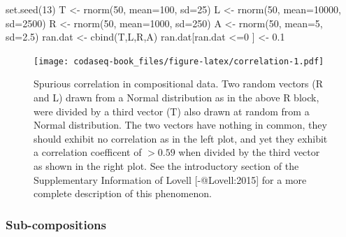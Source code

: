 \documentclass[
  onecolumn]{article}
\newenvironment{Shaded}{\begin{snugshade}}{\end{snugshade}}
\newcommand{\AttributeTok}[1]{\textcolor[rgb]{0.77,0.63,0.00}{#1}}
\newcommand{\DecValTok}[1]{\textcolor[rgb]{0.00,0.00,0.81}{#1}}
\newcommand{\FloatTok}[1]{\textcolor[rgb]{0.00,0.00,0.81}{#1}}
\newcommand{\FunctionTok}[1]{\textcolor[rgb]{0.00,0.00,0.00}{#1}}
\newcommand{\NormalTok}[1]{#1}
\newcommand{\OtherTok}[1]{\textcolor[rgb]{0.56,0.35,0.01}{#1}}
\newcommand{\SpecialCharTok}[1]{\textcolor[rgb]{0.00,0.00,0.00}{#1}}
\begin{document}
\begin{Shaded}
\begin{Highlighting}[]
\FunctionTok{set.seed}\NormalTok{(}\DecValTok{13}\NormalTok{)}
\NormalTok{T }\OtherTok{\textless{}{-}} \FunctionTok{rnorm}\NormalTok{(}\DecValTok{50}\NormalTok{, }\AttributeTok{mean=}\DecValTok{100}\NormalTok{, }\AttributeTok{sd=}\DecValTok{25}\NormalTok{)}
\NormalTok{L }\OtherTok{\textless{}{-}} \FunctionTok{rnorm}\NormalTok{(}\DecValTok{50}\NormalTok{, }\AttributeTok{mean=}\DecValTok{10000}\NormalTok{, }\AttributeTok{sd=}\DecValTok{2500}\NormalTok{)}
\NormalTok{R }\OtherTok{\textless{}{-}} \FunctionTok{rnorm}\NormalTok{(}\DecValTok{50}\NormalTok{, }\AttributeTok{mean=}\DecValTok{1000}\NormalTok{, }\AttributeTok{sd=}\DecValTok{250}\NormalTok{)}
\NormalTok{A }\OtherTok{\textless{}{-}} \FunctionTok{rnorm}\NormalTok{(}\DecValTok{50}\NormalTok{, }\AttributeTok{mean=}\DecValTok{5}\NormalTok{, }\AttributeTok{sd=}\FloatTok{2.5}\NormalTok{)}
\NormalTok{ran.dat }\OtherTok{\textless{}{-}} \FunctionTok{cbind}\NormalTok{(T,L,R,A)}
\NormalTok{ran.dat[ran.dat }\SpecialCharTok{\textless{}=}\DecValTok{0}\NormalTok{ ] }\OtherTok{\textless{}{-}} \FloatTok{0.1}
\end{Highlighting}
\end{Shaded}

\begin{figure}
\centering
\texttt{[image: codaseq-book\_files/figure-latex/correlation-1.pdf]}
\caption{\label{fig:correlation}Spurious correlation in compositional data. Two random vectors (R and L) drawn from a Normal distribution as in the above R block, were divided by a third vector (T) also drawn at random from a Normal distribution. The two vectors have nothing in common, they should exhibit no correlation as in the left plot, and yet they exhibit a correlation coefficent of \(>0.59\) when divided by the third vector as shown in the right plot. See the introductory section of the Supplementary Information of Lovell {[}-@Lovell:2015{]} for a more complete description of this phenomenon.}
\end{figure}

\hypertarget{sub-compositions}{%
\subsubsection{Sub-compositions}\label{sub-compositions}}
\end{document}
